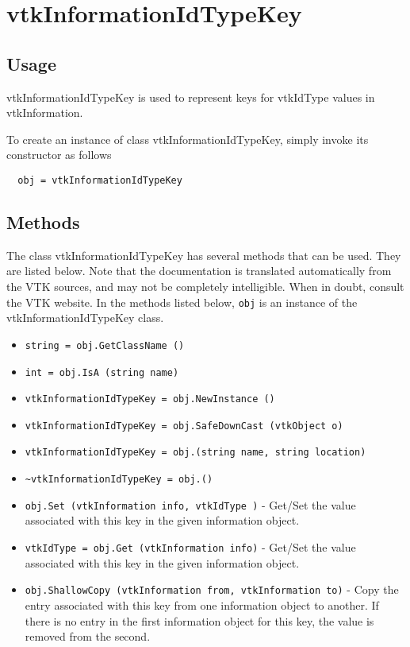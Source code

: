 \section{vtkInformationIdTypeKey}

\subsection{Usage}

 vtkInformationIdTypeKey is used to represent keys for vtkIdType values
 in vtkInformation.

To create an instance of class vtkInformationIdTypeKey, simply
invoke its constructor as follows
\begin{verbatim}
  obj = vtkInformationIdTypeKey
\end{verbatim}
\subsection{Methods}

The class vtkInformationIdTypeKey has several methods that can be used.
  They are listed below.
Note that the documentation is translated automatically from the VTK sources,
and may not be completely intelligible.  When in doubt, consult the VTK website.
In the methods listed below, \verb|obj| is an instance of the vtkInformationIdTypeKey class.
\begin{itemize}
\item  \verb|string = obj.GetClassName ()|

\item  \verb|int = obj.IsA (string name)|

\item  \verb|vtkInformationIdTypeKey = obj.NewInstance ()|

\item  \verb|vtkInformationIdTypeKey = obj.SafeDownCast (vtkObject o)|

\item  \verb|vtkInformationIdTypeKey = obj.(string name, string location)|

\item  \verb|~vtkInformationIdTypeKey = obj.()|

\item  \verb|obj.Set (vtkInformation info, vtkIdType )| -  Get/Set the value associated with this key in the given
 information object.

\item  \verb|vtkIdType = obj.Get (vtkInformation info)| -  Get/Set the value associated with this key in the given
 information object.

\item  \verb|obj.ShallowCopy (vtkInformation from, vtkInformation to)| -  Copy the entry associated with this key from one information
 object to another.  If there is no entry in the first information
 object for this key, the value is removed from the second.

\end{itemize}
